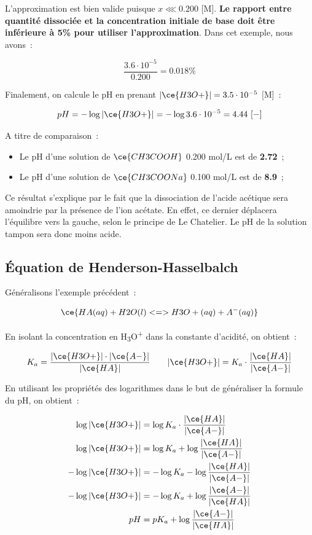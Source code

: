 \documentclass[
  11pt,
  a4paper,
  openany]{book}
\providecommand{\tightlist}{%
  \setlength{\itemsep}{0pt}\setlength{\parskip}{0pt}}
\begin{document}
L'approximation est bien valide puisque \(x \lll 0.200\) {[}M{]}. \textbf{Le rapport entre quantité dissociée et la concentration initiale de base doit être inférieure à 5\% pour utiliser l'approximation}. Dans cet exemple, nous avons~:

\[
\frac{3.6 \cdot 10^{-5}}{0.200} = 0.018\%
\]

Finalement, on calcule le pH en prenant \(|\ce{H3O+}| = 3.5 \cdot 10^{-5}\) {[}M{]}~:

\[
pH = - \log |\ce{H3O+}| = - \log 3.6 \cdot 10^{-5} = 4.44\ [-]
\]

A titre de comparaison~:

\begin{itemize}
\tightlist
\item
  Le pH d'une solution de \(\ce{CH3COOH}\) 0.200 mol/L est de \textbf{2.72}~;
\item
  Le pH d'une solution de \(\ce{CH3COONa}\) 0.100 mol/L est de \textbf{8.9}~;
\end{itemize}

Ce résultat s'explique par le fait que la dissociation de l'acide acétique sera amoindrie par la présence de l'ion acétate. En effet, ce dernier déplacera l'équilibre vers la gauche, selon le principe de Le Chatelier. Le pH de la solution tampon sera donc moins acide.

\hypertarget{uxe9quation-de-henderson-hasselbalch}{%
\subsection{Équation de Henderson-Hasselbalch}\label{uxe9quation-de-henderson-hasselbalch}}

Généralisons l'exemple précédent~:

\[
\ce{HA(aq) + H2O(l) <=> H3O+(aq) + A^{-}(aq)}
\]

En isolant la concentration en H\textsubscript{3}O\textsuperscript{+} dans la constante d'acidité, on obtient~:

\[
\begin{split}
K_a = \frac{|\ce{H3O+}| \cdot |\ce{A-}|}{|\ce{HA}|}
\end{split}
\qquad
\begin{split}
|\ce{H3O+}| = K_a \cdot \frac{|\ce{HA}|}{|\ce{A-}|}
\end{split}
\]

En utilisant les propriétés des logarithmes dans le but de généraliser la formule du pH, on obtient~:

\[
\begin{split}
\log |\ce{H3O+}| &= \log K_a \cdot \frac{|\ce{HA}|}{|\ce{A-}|} \\
\log |\ce{H3O+}| &= \log K_a + \log \frac{|\ce{HA}|}{|\ce{A-}|} \\
- \log |\ce{H3O+}| &= - \log K_a - \log \frac{|\ce{HA}|}{|\ce{A-}|} \\
- \log |\ce{H3O+}| &= - \log K_a + \log \frac{|\ce{A-}|}{|\ce{HA}|} \\
pH &= pK_a + \log \frac{|\ce{A-}|}{|\ce{HA}|}
\end{split}
\]
\end{document}
